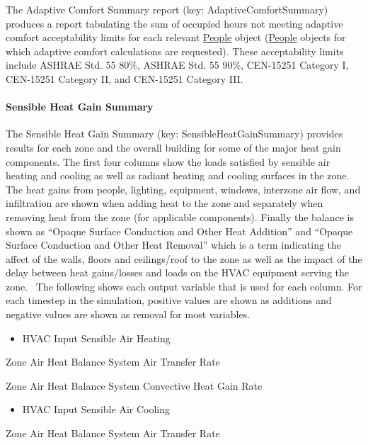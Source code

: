 The Adaptive Comfort Summary report (key: AdaptiveComfortSummary) produces a report tabulating the sum of occupied hours not meeting adaptive comfort acceptability limits for each relevant \hyperref[people]{People} object (\hyperref[people]{People} objects for which adaptive comfort calculations are requested). These acceptability limits include ASHRAE Std. 55 80\%, ASHRAE Std. 55 90\%, CEN-15251 Category I, CEN-15251 Category II, and CEN-15251 Category III.

\paragraph{Sensible Heat Gain Summary}\label{sensible-heat-gain-summary}

The Sensible Heat Gain Summary (key: SensibleHeatGainSummary) provides results for each zone and the overall building for some of the major heat gain components. The first four columns show the loads satisfied by sensible air heating and cooling as well as radiant heating and cooling surfaces in the zone. The heat gains from people, lighting, equipment, windows, interzone air flow, and infiltration are shown when adding heat to the zone and separately when removing heat from the zone (for applicable components). Finally the balance is shown as ``Opaque Surface Conduction and Other Heat Addition'' and ``Opaque Surface Conduction and Other Heat Removal'' which is a term indicating the affect of the walls, floors and ceilings/roof to the zone as well as the impact of the delay between heat gains/losses and loads on the HVAC equipment serving the zone.~ The following shows each output variable that is used for each column. For each timestep in the simulation, positive values are shown as additions and negative values are shown as removal for most variables.

\begin{itemize}
\tightlist
\item
  HVAC Input Sensible Air Heating
\end{itemize}

Zone Air Heat Balance System Air Transfer Rate

Zone Air Heat Balance System Convective Heat Gain Rate

\begin{itemize}
\tightlist
\item
  HVAC Input Sensible Air Cooling
\end{itemize}

Zone Air Heat Balance System Air Transfer Rate


